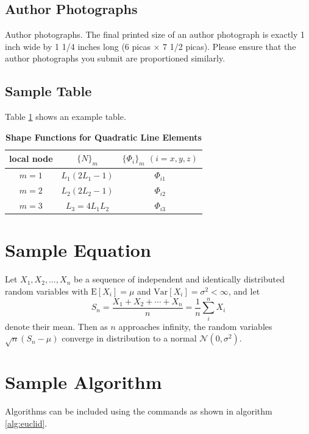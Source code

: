 \documentclass[9pt,twocolumn,twoside]{osajnl}
\begin{document}
\subsection{Author Photographs}
Author photographs. The final printed size of an author photograph is exactly 1 inch wide by 1 1/4 inches long (6 picas × 7 1/2 picas). Please ensure that the author photographs you submit are proportioned similarly.

\subsection{Sample Table}

Table \ref{tab:shapefunctions} shows an example table.

\begin{table}[htbp]
\centering
\caption{\bf Shape Functions for Quadratic Line Elements}
\begin{tabular}{ccc}
\hline
local node & $\{N\}_m$ & $\{\Phi_i\}_m$ $(i=x,y,z)$ \\
\hline
$m = 1$ & $L_1(2L_1-1)$ & $\Phi_{i1}$ \\
$m = 2$ & $L_2(2L_2-1)$ & $\Phi_{i2}$ \\
$m = 3$ & $L_3=4L_1L_2$ & $\Phi_{i3}$ \\
\hline
\end{tabular}
  \label{tab:shapefunctions}
\end{table}

\section{Sample Equation}

Let $X_1, X_2, \ldots, X_n$ be a sequence of independent and identically distributed random variables with $\text{E}[X_i] = \mu$ and $\text{Var}[X_i] = \sigma^2 < \infty$, and let
\begin{equation}
S_n = \frac{X_1 + X_2 + \cdots + X_n}{n}
      = \frac{1}{n}\sum_{i}^{n} X_i
\label{eq:refname1}
\end{equation}
denote their mean. Then as $n$ approaches infinity, the random variables $\sqrt{n}(S_n - \mu)$ converge in distribution to a normal $\mathcal{N}(0, \sigma^2)$.

\section{Sample Algorithm}

Algorithms can be included using the commands as shown in algorithm \ref{alg:euclid}.
\end{document}
